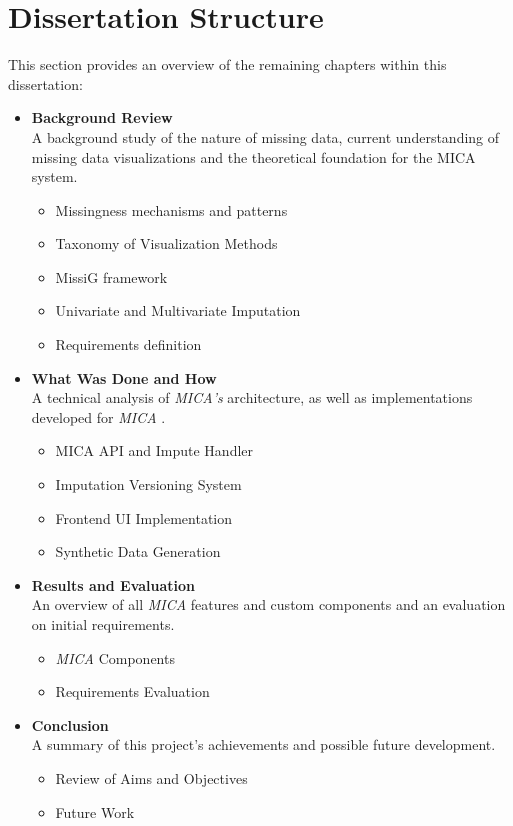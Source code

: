 \documentclass[a4paper, 11pt]{article}
\newcommand{\mica}{\textit{MICA }}
\newcommand{\micas}{\textit{MICA's }}
\begin{document}
\section{Dissertation Structure}
This section provides an overview of the remaining chapters within this dissertation:

\begin{itemize}[leftmargin=1.5em]
    \item \textbf{Background Review} \\
    A background study of the nature of missing data, current understanding of
    missing data visualizations and the theoretical foundation for the MICA
    system.
    \begin{itemize}
        \item Missingness mechanisms and patterns
        \item Taxonomy of Visualization Methods
        \item MissiG framework
        \item Univariate and Multivariate Imputation
        \item Requirements definition
    \end{itemize}

    \item \textbf{What Was Done and How} \\
    A technical analysis of \micas architecture, as well as implementations
    developed for \mica.
    \begin{itemize}
        \item MICA API and Impute Handler
        \item Imputation Versioning System
        \item Frontend UI Implementation
        \item Synthetic Data Generation
    \end{itemize}

    \item \textbf{Results and Evaluation} \\
    An overview of all \mica features and custom components and an evaluation
    on initial requirements.
    \begin{itemize}
        \item \mica Components
        \item Requirements Evaluation
    \end{itemize}

    \item \textbf{Conclusion} \\
    A summary of this project's achievements and possible future development.
    \begin{itemize}
        \item Review of Aims and Objectives
        \item Future Work
    \end{itemize}
\end{itemize}
\end{document}

